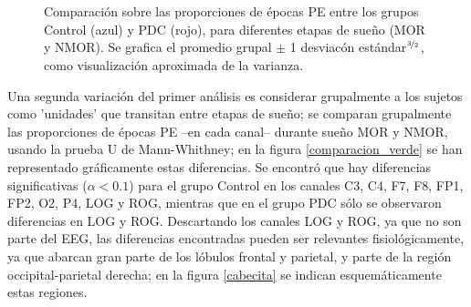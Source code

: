 \documentclass[12pt,a4paper]{mitthesis}
\begin{document}
\begin{figure}
\centering
{}\\
\\
\caption{Comparaci\'on sobre las proporciones de \'epocas PE entre los grupos Control (azul) y PDC 
(rojo), para diferentes etapas de sue\~no (MOR y NMOR). Se grafica el promedio grupal $\pm$ 1 
desviac\'on est\'andar$^{\nicefrac{3}{2}}$, como visualizaci\'on aproximada de la varianza.}
\label{comparacion_graf}
\end{figure}

Una segunda variaci\'on del primer an\'alisis es considerar grupalmente a los sujetos como 
'unidades' que transitan entre etapas de sue\~no; se comparan grupalmente las proporciones de 
\'epocas PE --en cada canal-- durante sue\~no MOR y NMOR, usando la prueba U de Mann-Whithney; en 
la figura \ref{comparacion_verde} se han representado gr\'aficamente estas diferencias.
Se encontr\'o que hay diferencias significativas ($\alpha<0.1$) para el grupo Control en los 
canales C3, C4, F7, F8, FP1, FP2, O2, P4, LOG y ROG, mientras que en el grupo PDC s\'olo se
observaron diferencias en LOG y ROG.
Descartando los canales LOG y ROG, ya que no son parte del EEG, las diferencias encontradas pueden 
ser relevantes fisiol\'ogicamente, ya que abarcan gran parte de los l\'obulos frontal y parietal, 
y parte de la regi\'on occipital-parietal derecha; en la figura \ref{cabecita} se indican 
esquem\'aticamente estas regiones.
\end{document}
